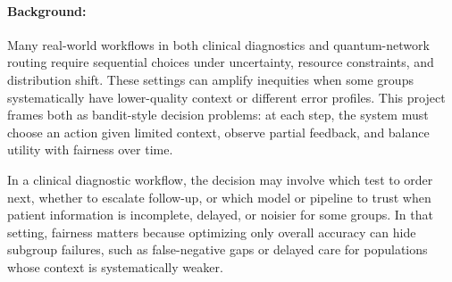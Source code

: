 \documentclass[11pt]{article}
\begin{document}


\paragraph{Background:} \hspace{-5mm}
Many real-world workflows in both clinical diagnostics and quantum-network routing require sequential choices under uncertainty, resource constraints, and distribution shift. These settings can amplify inequities when some groups systematically have lower-quality context or different error profiles. This project frames both as bandit-style decision problems: at each step, the system must choose an action given limited context, observe partial feedback, and balance utility with fairness over time.

In a clinical diagnostic workflow, the decision may involve which test to order next, whether to escalate follow-up, or which model or pipeline to trust when patient information is incomplete, delayed, or noisier for some groups. In that setting, fairness matters because optimizing only overall accuracy can hide subgroup failures, such as false-negative gaps or delayed care for populations whose context is systematically weaker.
\end{document}
